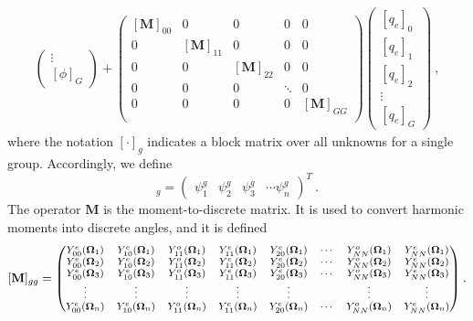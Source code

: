 \documentclass[12pt,twoside]{article}
\newcommand{\ve}[1]{\ensuremath{\mathbf{#1}}}
\newcommand{\vOmega}{\ensuremath{\ve{\Omega}}}
\newcommand{\Ye}[2]{\ensuremath{Y^e_{#1}(\vOmega_#2)}}
\newcommand{\Yo}[2]{\ensuremath{Y^o_{#1}(\vOmega_#2)}}
\begin{document}
\begin{multline}
\begin{pmatrix}
      \vdots   \\
      [\phi]_G
    \end{pmatrix}
    +
    \begin{pmatrix}
      [\ve{M}]_{00} & 0 & 0 & 0 & 0 \\
      0 & [\ve{M}]_{11} & 0 & 0 & 0 \\
      0 & 0 & [\ve{M}]_{22} & 0 & 0 \\
      0 & 0 & 0 & \ddots & 0 \\
      0 & 0 & 0 & 0 & [\ve{M}]_{GG} \\
    \end{pmatrix}
    \begin{pmatrix}
      [q_e]_0 \\
      [q_e]_1 \\
      [q_e]_2 \\
      \vdots   \\
      [q_e]_G
    \end{pmatrix}\:,
    \label{eq:matrix-transport}
\end{multline}
where the notation $[\cdot]_g$ indicates a block matrix over all
unknowns for a single group.  Accordingly, we define
\begin{equation}
  [\psi]_g = \begin{pmatrix}
    \psi^g_1 & \psi^g_2 & \psi^g_3 & \cdots \psi^g_n
  \end{pmatrix}^T\:.
\end{equation}
%
The operator $\ve{M}$ is the moment-to-discrete matrix. It is used
to convert harmonic moments into discrete angles, and it is defined
\begin{equation}
  {\footnotesize
  [\ve{M}]_{gg} = \begin{pmatrix}
    \Ye{00}{1} & \Ye{10}{1} & \Yo{11}{1} & \Ye{11}{1} &
    \Ye{20}{1} & \cdots & \Yo{NN}{1} & \Ye{NN}{1} \\
    \Ye{00}{2} & \Ye{10}{2} & \Yo{11}{2} & \Ye{11}{2} &
    \Ye{20}{2} & \cdots & \Yo{NN}{2} & \Ye{NN}{2} \\
    \Ye{00}{3} & \Ye{10}{3} & \Yo{11}{3} & \Ye{11}{3} &
    \Ye{20}{3} & \cdots & \Yo{NN}{3} & \Ye{NN}{3} \\
    \vdots     & \vdots     & \vdots     & \vdots     &
    \vdots     &        & \vdots     & \vdots     \\
    \Ye{00}{n} & \Ye{10}{n} & \Yo{11}{n} & \Ye{11}{n} &
    \Ye{20}{n} & \cdots & \Yo{NN}{n} & \Ye{NN}{n}
  \end{pmatrix}}\:.
\end{equation}
\end{document}
